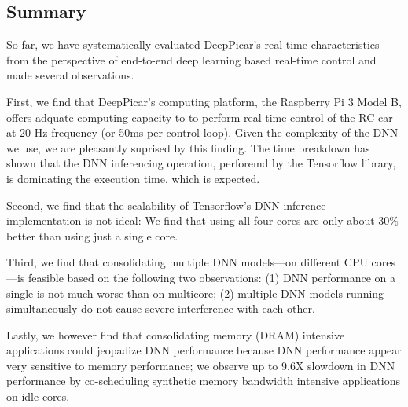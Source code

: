 \subsection{Summary}
So far, we have systematically evaluated DeepPicar's real-time
characteristics from the perspective of end-to-end deep learning based
real-time control and made several observations.

First, we find that DeepPicar's computing platform,
the Raspberry Pi 3 Model B, offers adquate computing capacity to
to perform real-time control of the RC car at 20 Hz frequency (or
50ms per control loop). Given the complexity of the DNN we use, we are
pleasantly suprised by this finding. The time breakdown has shown that
the DNN inferencing operation, perforemd by the Tensorflow library, is
dominating the execution time, which is expected.

Second, we find that the scalability of Tensorflow's DNN inference 
implementation is not ideal: We find that using all four cores are 
only about 30\% better than using just a single core.

Third, we find that consolidating multiple DNN models---on different CPU
cores---is feasible based on the following two observations: (1)
DNN performance on a single is not much worse than on multicore; (2)
multiple DNN models running simultaneously do not cause severe
interference with each other.

Lastly, we however find that consolidating memory (DRAM) intensive
applications could jeopadize DNN performance because DNN performance
appear very sensitive to memory performance; we observe up to 9.6X
slowdown in DNN performance by co-scheduling synthetic memory
bandwidth intensive applications on idle cores.



